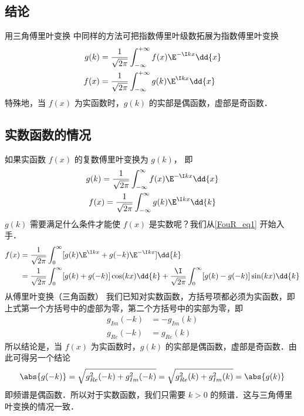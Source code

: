 

\subsection{结论}
用三角傅里叶变换  中同样的方法可把指数傅里叶级数拓展为指数傅里叶变换
\begin{align}
g(k) &= \frac{1}{\sqrt{2\pi}} \int_{-\infty}^{+\infty} f(x)\E^{-\I kx} \dd{x} \\
f(x) &= \frac{1}{\sqrt{2\pi}} \int_{-\infty}^{+\infty} g(k)\E^{\I kx} \dd{x}
\end{align}
特殊地，当 $f(x)$ 为实函数时，$g(k)$ 的实部是偶函数，虚部是奇函数．

\subsection{实数函数的情况}

如果实函数 $f(x)$ 的复数傅里叶变换为 $g(k)$， 即
\begin{gather}
g(k) = \frac{1}{\sqrt{2\pi}} \int_{-\infty}^\infty f(x)\E^{-\I kx} \dd{x}\\
f(x) = \frac{1}{\sqrt{2\pi}} \int_{-\infty}^\infty g(k)\E^{\I kx} \dd{k} \label{FouR_eq1}
\end{gather}
$g(k)$ 需要满足什么条件才能使 $f(x)$ 是实数呢？我们从\autoref{FouR_eq1} 开始入手．
\begin{equation}\begin{aligned}
f(x) &= \frac{1}{\sqrt{2\pi}} \int_0^\infty [g(k)\E^{\I kx} + g(-k)\E^{-\I kx}] \dd{k} \\
&= \frac{1}{\sqrt{2\pi}} \int_0^\infty [g(k)+g(-k)]\cos(kx)\dd{k} + \frac{\I}{\sqrt{2\pi}} \int_0^\infty [g(k)-g(-k)]\sin(kx) \dd{k}
\end{aligned}\end{equation}
从傅里叶变换（三角函数）%
我们已知对实数函数，方括号项都必须为实函数，即上式第一个方括号中的虚部为零，第二个方括号中的实部为零，即
\begin{equation}\begin{aligned}
g_{Im}(-k) &= -g_{Im}(k) \\
g_{Re}(-k) &= g_{Re}(k)
\end{aligned}\end{equation}
所以结论是，当 $f(x)$ 为实函数时，$g(k)$ 的实部是偶函数，虚部是奇函数．由此可得另一个结论
\begin{equation}
\abs{g(-k)}=\sqrt{g_{Re}^2(-k)+g_{Im}^2(-k)}=\sqrt{g_{Re}^2(k)+g_{Im}^2(k)} = \abs{g(k)}
\end{equation}
即频谱是偶函数．所以对于实数函数，我们只需要 $k>0$ 的频谱．这与三角傅里叶变换的情况一致．